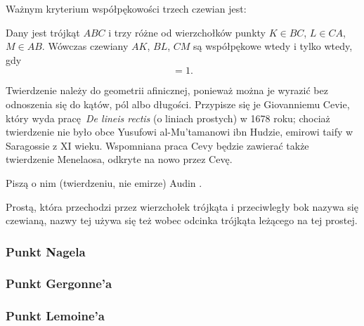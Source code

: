 %

Ważnym kryterium współpękowości trzech czewian jest:

\begin{theorem}[Cevy]
	Dany jest trójkąt $ABC$ i trzy różne od wierzchołków punkty $K \in BC$, $L \in CA$, $M \in AB$.
	Wówczas czewiany $AK$, $BL$, $CM$ są współpękowe wtedy i tylko wtedy, gdy
	\begin{equation}
		[AMB] [BKC] [CLA] = 1.
	\end{equation}
\end{theorem}

Twierdzenie należy do geometrii afinicznej, ponieważ można je wyrazić bez odnoszenia się do kątów, pól albo długości.
Przypisze się je Giovanniemu Cevie, który wyda pracę \emph{De lineis rectis} (o liniach prostych) w 1678 roku; chociaż twierdzenie nie było obce Yusufowi al-Mu'tamanowi ibn Hudzie, emirowi taify w Saragossie z XI wieku.
%
%
Wspomniana praca Cevy będzie zawierać także twierdzenie Menelaosa, odkryte na nowo przez Cevę.

Piszą o nim (twierdzeniu, nie emirze) Audin \cite[s. 38]{audin_2003}.

Prostą, która przechodzi przez wierzchołek trójkąta i przeciwległy bok nazywa się czewianą, nazwy tej używa się też wobec odcinka trójkąta leżącego na tej prostej.

\begin{proposition}
\end{proposition}

\subsubsection{Punkt Nagela}

\subsubsection{Punkt Gergonne'a}


\subsubsection{Punkt Lemoine'a}




%